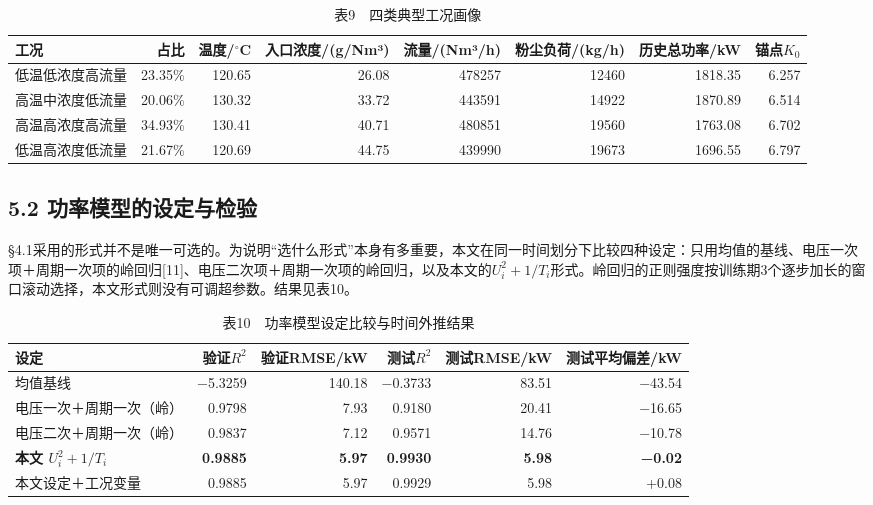 \documentclass[UTF8,zihao=5,a4paper]{ctexart}
\begin{document}
\begin{table}[htb]
\centering
\caption*{\normalsize 表9　四类典型工况画像}
\vspace{-2pt}
\begin{tabularx}{\textwidth}{>{\hsize=1.000\hsize\raggedright\arraybackslash}Xrrrrrrr}
\toprule
工况 & 占比 & 温度/$^\circ$C & 入口浓度/(g/Nm³) & 流量/(Nm³/h) & 粉尘负荷/(kg/h) & 历史总功率/kW & 锚点$K_0$ \\
\midrule
1 低温低浓度高流量 & 23.35\% & 120.65 & 26.08 & 478257 & 12460 & 1818.35 & 6.257 \\
2 高温中浓度低流量 & 20.06\% & 130.32 & 33.72 & 443591 & 14922 & 1870.89 & 6.514 \\
3 高温高浓度高流量 & 34.93\% & 130.41 & 40.71 & 480851 & 19560 & 1763.08 & 6.702 \\
4 低温高浓度低流量 & 21.67\% & 120.69 & 44.75 & 439990 & 19673 & 1696.55 & 6.797 \\
\bottomrule
\end{tabularx}
\end{table}

\subsection*{5.2 功率模型的设定与检验}

§4.1采用的形式并不是唯一可选的。为说明“选什么形式”本身有多重要，本文在同一时间划分下比较四种设定：只用均值的基线、电压一次项＋周期一次项的岭回归[11]、电压二次项＋周期一次项的岭回归，以及本文的$U_i^2+1/T_i$形式。岭回归的正则强度按训练期3个逐步加长的窗口滚动选择，本文形式则没有可调超参数。结果见表10。


\begin{table}[htb]
\centering
\caption*{\normalsize 表10　功率模型设定比较与时间外推结果}
\vspace{-2pt}
\begin{tabularx}{\textwidth}{>{\hsize=1.000\hsize\raggedright\arraybackslash}Xrrrrr}
\toprule
设定 & 验证$R^2$ & 验证RMSE/kW & 测试$R^2$ & 测试RMSE/kW & 测试平均偏差/kW \\
\midrule
均值基线 & −5.3259 & 140.18 & −0.3733 & 83.51 & −43.54 \\
电压一次＋周期一次（岭） & 0.9798 & 7.93 & 0.9180 & 20.41 & −16.65 \\
电压二次＋周期一次（岭） & 0.9837 & 7.12 & 0.9571 & 14.76 & −10.78 \\
\textbf{本文 $U_i^2+1/T_i$} & \textbf{0.9885} & \textbf{5.97} & \textbf{0.9930} & \textbf{5.98} & \textbf{−0.02} \\
本文设定＋工况变量 & 0.9885 & 5.97 & 0.9929 & 5.98 & +0.08 \\
\bottomrule
\end{tabularx}
\end{table}
\end{document}

